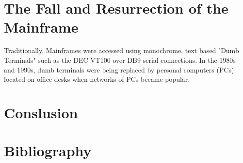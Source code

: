 \documentclass[a4paper,12pt]{article}
\begin{document}
\section{The Fall and Resurrection of the Mainframe}

Traditionally, Mainframes were accessed using monochrome, text 
based "Dumb Terminals" such as the DEC VT100 over DB9 serial 
connections. In the 1980s and 1990s, dumb terminals were being replaced
by personal computers (PCs) located on office desks when networks of PCs
became popular.


\cite[In the late 1990s, corporations found new uses for their
mainframes, since they can offer web server performance similar to that 
of hundreds of smaller machines, but with much lower power and 
administration costs. The growth of e-business has also dramatically 
increased the number of backend transactions processed by 
tried-and-true mainframe software as well as the size and 
throughput of databases. In late 2004, IBM's mainframe revenues were
increasing even with price reductions, thanks to attractive TCOs.]{m1}

\section{Conslusion}

\section{Bibliography}


\end{document}
